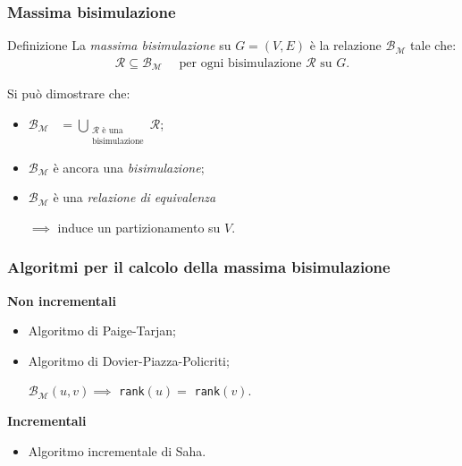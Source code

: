 \documentclass{beamer}
\begin{document}
\begin{frame}\frametitle{Massima bisimulazione}
    \begin{block}{Definizione}
        La \emph{massima bisimulazione} su $G = (V,E)$ è la relazione $\mathcal{B}_\mathcal{M}$ tale che:
        \begin{gather*}
            \mathcal{R} \subseteq \mathcal{B}_\mathcal{M} \quad \text{ per ogni bisimulazione } \mathcal{R} \text{ su } G.
        \end{gather*}
    \end{block}

    \bigskip\bigskip

    Si può dimostrare che:
    \begin{itemize}
        \item $\displaystyle \mathcal{B}_\mathcal{M} \,\,\,\,\,= \bigcup_{\substack{\mathcal{R} \text{ è una}\\\text{bisimulazione}}} \mathcal{R}$;
        \item $\mathcal{B}_\mathcal{M}$ è ancora una \emph{bisimulazione};
        \item $\mathcal{B}_\mathcal{M}$ è una \emph{relazione di equivalenza}

        $\implies$ induce un partizionamento su $V$.
    \end{itemize}
\end{frame}

\begin{frame}\frametitle{Algoritmi per il calcolo della massima bisimulazione}
    \textbf{Non incrementali}
    \begin{itemize}
        \item Algoritmo di Paige-Tarjan;
        \item Algoritmo di Dovier-Piazza-Policriti;

        \qquad $\mathcal{B}_\mathcal{M}(u,v) \implies$ \texttt{rank}$(u) =$ \texttt{rank}$(v)$.
    \end{itemize}

    \bigskip

    \textbf{Incrementali}
    \begin{itemize}
        \item Algoritmo incrementale di Saha.
    \end{itemize}
\end{frame}
\end{document}
